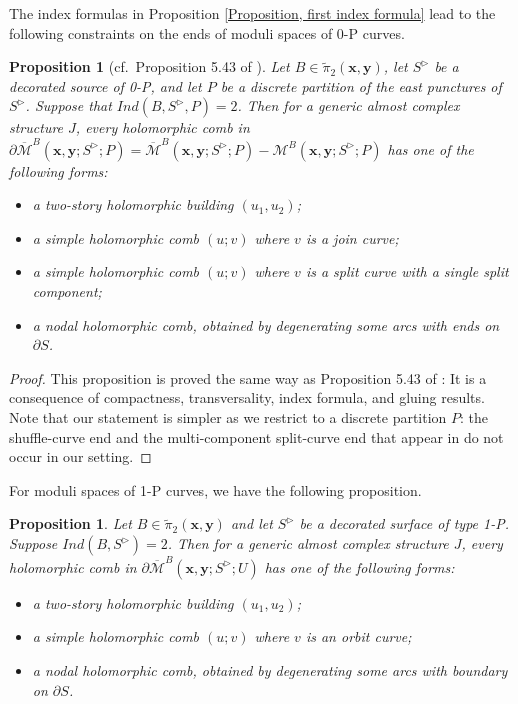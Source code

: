 \documentclass{amsart}
\newtheorem{prop}[thm]{Proposition}
\theoremstyle{definition}
\theoremstyle{remark}
\numberwithin{equation}{section}
\numberwithin{equation}{section} \makeatletter
\begin{document}
The index formulas in Proposition \ref{Proposition, first index formula} lead to the following constraints on the ends of moduli spaces of 0-P curves.
\begin{prop}[cf.\ Proposition 5.43 of \cite{LOT18}]\label{Proposition, first constraint on the boundary of 1-dimensional moduli space}
Let $B\in \tilde{\pi}_2(\bm{x},\bm{y})$, let $S^\triangleright$ be a decorated source of 0-P, and let $P$ be a discrete partition of the east punctures of $S^\triangleright$. Suppose that $Ind(B,S^{\triangleright},P)=2$. Then for a generic almost complex structure $J$,
every holomorphic comb in $\partial\overline{\mathcal{M}}^{B}(\bm{x},\bm{y};S^{\triangleright};P)=\overline{\mathcal{M}}^{B}(\bm{x},\bm{y};S^{\triangleright};P)-\mathcal{M}^{B}(\bm{x},\bm{y};S^{\triangleright};P)$ has one of the following forms:
\begin{itemize}
\item[(1)]a two-story holomorphic building $(u_1, u_2)$;
\item[(2)]a simple holomorphic comb $(u; v)$ where $v$ is a join curve;
\item[(3)]a simple holomorphic comb $(u; v)$ where $v$ is a split curve with a single split component; 
\item[(4)]a nodal holomorphic comb, obtained by degenerating some arcs with ends on $\partial S$.
\end{itemize}
\end{prop}

\begin{proof}
This proposition is proved the same way as Proposition 5.43 of \cite{LOT18}: It is a consequence of compactness, transversality, index formula, and gluing results. Note that our statement is simpler as we restrict to a discrete partition $P$: the shuffle-curve end and the multi-component split-curve end that appear in \cite{LOT18} do not occur in our setting. 
\end{proof}
For moduli spaces of 1-P curves, we have the following proposition.
\begin{prop}\label{Proposition, first constraints on degeneration of 1-P curves}
Let $B\in \tilde{\pi}_2(\bm{x},\bm{y})$ and let $S^\triangleright$ be a decorated surface of type 1-P. Suppose $Ind(B,S^\triangleright)=2$. Then for a generic almost complex structure $J$, every holomorphic comb in $\partial\overline{\mathcal{M}}^{B}(\bm{x},\bm{y};S^{\triangleright};U)$ has one of the following forms:
\begin{itemize}
\item[(1)]a two-story holomorphic building $(u_1,u_2)$;
\item[(2)]a simple holomorphic comb $(u; v)$ where $v$ is an orbit curve;
\item[(3)]a nodal holomorphic comb, obtained by degenerating some arcs with boundary on $\partial S$.
\end{itemize}
\end{prop}
\end{document}
